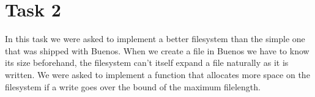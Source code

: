 \section{Task 2}
In this task we were asked to implement a better filesystem than the simple one
that was shipped with Buenos.  When we create a file in Buenos we have to know
its size beforehand, the filesystem can't itself expand a file naturally as it
is written.  We were asked to implement a function that allocates more space on
the filesystem if a write goes over the bound of the maximum filelength.

